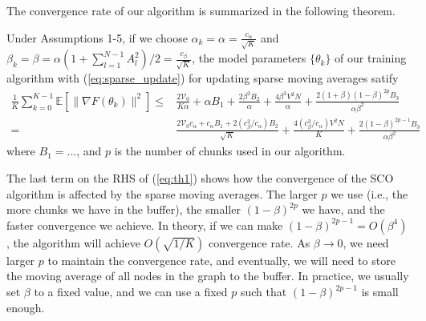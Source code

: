 The convergence rate of our algorithm is summarized in the following theorem. 
\begin{theorem}
  Under Assumptions 1-5, if we choose $\alpha_k=\alpha=\frac{c_\alpha}{\sqrt{K}}$ and $\beta_k=\beta={\alpha}(1+\sum_{l=1}^{N-1}A_l^2)/2=\frac{c_{\beta}}{\sqrt{K}}$, the model parameters $\{\theta_k\}$ of our training algorithm with (\ref{eq:sparse_update}) for updating sparse moving averages satify
\begin{equation}
  \label{eq:th1}
  \begin{split}
  \frac{1}{K}\sum_{k=0}^{K-1}\mathbb{E}[\|\nabla F(\theta_k)\|^2] \leq&  \frac{2\mathcal{V}_0}{K\alpha} + \alpha B_1 + \frac{2\beta^2 B_2}{\alpha}+ \frac{4\beta^3V^2N}{\alpha} + \frac{2(1+\beta)(1-\beta)^{2p}B_3}{\alpha\beta^2} \\
= &\frac{2\mathcal{V}_0c_{\alpha}+c_{\alpha} B_1 + 2(c_{\beta}^2/c_\alpha) B_2}{\sqrt{K}} + \frac{4(c_{\beta}^3/c_\alpha) V^2N}{K} + \frac{2(1-\beta)^{2p-1}B_3}{\alpha\beta^2}
  \end{split}
\end{equation}
where $B_1=...$, and $p$ is the number of chunks used in our algorithm. 
\end{theorem}
The last term on the RHS of (\ref{eq:th1}) shows how the convergence of the SCO algorithm is affected by the sparse moving averages. 
The larger $p$ we use (i.e., the more chunks we have in the buffer), the smaller $(1-\beta)^{2p}$ we have, and the faster convergence we achieve. 
In theory, if we can make $(1-\beta)^{2p-1}=O(\beta^{4})$, the algorithm will achieve $O(\sqrt{1/K})$ convergence rate. 
As $\beta\rightarrow 0$, we need larger $p$ to maintain the convergence rate, and eventually, we will need to store the moving average of all nodes in the graph to the buffer.  
In practice, we usually set $\beta$ to a fixed value, and we can use a fixed $p$ such that $(1-\beta)^{2p-1}$ is small enough. 

